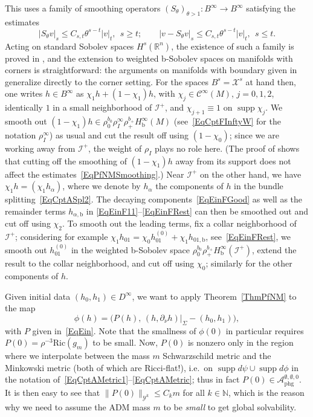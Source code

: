 \documentclass[reqno,11pt,letterpaper]{amsart}
\numberwithin{equation}{section}
\numberwithin{figure}{section}
\theoremstyle{definition}
\theoremstyle{remark}
\newcommand{\mc}{\mathcal}
\newcommand{\cA}{\mc A}
\newcommand{\cC}{\mc C}
\newcommand{\cX}{\mc X}
\newcommand{\cY}{\mc Y}
\newcommand{\ms}{\mathscr}
\newcommand{\scri}{\ms I}
\newcommand{\N}{\mathbb{N}}
\newcommand{\R}{\mathbb{R}}
\newcommand{\supp}{\operatorname{supp}}
\newcommand{\pa}{\partial}
\newcommand{\bop}{{\mathrm{b}}}
\newcommand{\CI}{\cC^\infty}
\newcommand{\Hb}{H_{\bop}}
\newcommand{\phg}{{\mathrm{phg}}}
\newcommand{\Ric}{\mathrm{Ric}}
\begin{document}
This uses a family of smoothing operators $(S_\theta)_{\theta>1}\colon B^\infty\to B^\infty$ satisfying the estimates
\begin{equation}
\label{EqPfNMSmoothing}
  |S_\theta v|_s\leq C_{s,t}\theta^{s-t}|v|_t,\ \ s\geq t; \qquad |v-S_\theta v|_s\leq C_{s,t}\theta^{s-t}|v|_t,\ \ s\leq t.
\end{equation}
Acting on standard Sobolev spaces $H^s(\R^n)$, the existence of such a family is proved in \cite[Appendix]{SaintRaymondNashMoser}, and the extension to weighted b-Sobolev spaces on manifolds with corners is straightforward: the arguments on manifolds with boundary given in~\cite[\S11.2]{HintzVasyKdSStability} generalize directly to the corner setting. For the spaces $B^s=\cX^s$ at hand then, one writes $h\in B^\infty$ as $\chi_1 h+(1-\chi_1)h$, with $\chi_j\in\CI(M)$, $j=0,1,2$, identically $1$ in a small neighborhood of $\scri^+$, and $\chi_{j+1}\equiv 1$ on $\supp\chi_j$. We smooth out $(1-\chi_1)h\in\rho_0^{b_0}\rho_I^\infty\rho_+^{b_+}\Hb^\infty(M)$ (see~\eqref{EqCptFInftyW} for the notation $\rho_I^\infty$) as usual and cut the result off using $(1-\chi_0)$; since we are working away from $\scri^+$, the weight of $\rho_I$ plays no role here. (The proof of \cite[Lemma~5.9]{HintzVasyQuasilinearKdS} shows that cutting off the smoothing of $(1-\chi_1)h$ away from its support does not affect the estimates~\eqref{EqPfNMSmoothing}.) Near $\scri^+$ on the other hand, we have $\chi_1 h=(\chi_1 h_\alpha)$, where we denote by $h_\alpha$ the components of $h$ in the bundle splitting~\eqref{EqCptASpl2}. The decaying components~\eqref{EqEinFGood} as well as the remainder terms $h_{\alpha,\bop}$ in \eqref{EqEinF11}--\eqref{EqEinFRest} can then be smoothed out and cut off using $\chi_2$. To smooth out the leading terms, fix a collar neighborhood of $\scri^+$; considering for example $\chi_1 h_{0 1}=\chi_0 h_{0 1}^{(0)} + \chi_1 h_{0 1,\bop}$, see~\eqref{EqEinFRest}, we smooth out $h_{0 1}^{(0)}$ in the weighted b-Sobolev space $\rho_0^{b_0}\rho_+^{b_+}\Hb^\infty(\scri^+)$, extend the result to the collar neighborhood, and cut off using $\chi_0$; similarly for the other components of $h$.

Given initial data $(h_0,h_1)\in D^\infty$, we want to apply Theorem~\ref{ThmPfNM} to the map
\begin{equation}
\label{EqPfMap}
  \phi(h)=\bigl(P(h),\,(h,\pa_\nu h)|_\Sigma-(h_0,h_1)\bigr),
\end{equation}
with $P$ given in~\eqref{EqEin}. Note that the smallness of $\phi(0)$ in particular requires $P(0)=\rho^{-3}\Ric(g_m)$ to be small. Now, $P(0)$ is nonzero only in the region where we interpolate between the mass $m$ Schwarzschild metric and the Minkowski metric (both of which are Ricci-flat!), i.e.\ on $\supp d\psi\cup\supp d\phi$ in the notation of~\eqref{EqCptAMetric1}--\eqref{EqCptAMetric}; thus in fact $P(0)\in\cA_\phg^{\emptyset,\emptyset,0}$. It is then easy to see that $\|P(0)\|_{\cY^k}\leq C_k m$ for all $k\in\N$, which is the reason why we need to assume the ADM mass $m$ to be \emph{small} to get global solvability.
\end{document}
